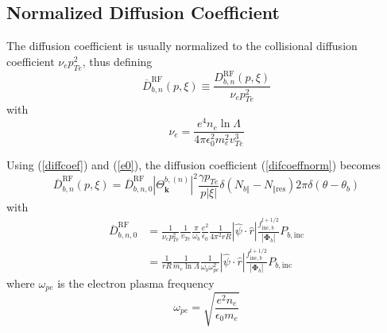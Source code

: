 \subsection{Normalized Diffusion Coefficient}

The diffusion coefficient is usually normalized to the collisional diffusion
coefficient $\nu_{e}p_{Te}^{2}$, thus defining
\begin{equation}
\overline{D}_{b,n}^{\text{RF}}(p,\xi)\equiv\frac{D_{b,n}^{\text{RF}}(p,\xi
)}{\nu_{e}p_{Te}^{2}} \label{difcoeffnorm}%
\end{equation}
with
\begin{equation}
\nu_{e}=\frac{e^{4}n_{e}\ln\Lambda}{4\pi\epsilon_{0}^{2}m_{e}^{2}v_{Te}^{3}}%
\end{equation}

Using (\ref{diffcoef}) and (\ref{e0}), the diffusion coefficient
(\ref{difcoeffnorm}) becomes
\begin{equation}
\overline{D}_{b,n}^{\text{RF}}(p,\xi)=\overline{D}_{b,n,0}^{\text{RF}}\left|
\Theta_{\mathbf{k}}^{b,\left(  n\right)  }\right|  ^{2}\frac{\gamma p_{Te}%
}{p\left|  \xi\right|  }\delta\left(  N_{b\Vert}-N_{\Vert\text{res}}\right)
2\pi\delta\left(  \theta-\theta_{b}\right)  \label{difcoeffnorm2}%
\end{equation}
with
\begin{align}
\overline{D}_{b,n,0}^{\text{RF}}  &  =\frac{1}{\nu_{e}p_{Te}^{2}}\frac
{1}{v_{Te}}\frac{\pi}{\omega_{b}}\frac{e^{2}}{\epsilon_{0}}\frac{1}{4\pi
^{2}rR}\left|  \widehat{\psi}\cdot\widehat{r}\right|  \frac{f_{\text{inc}%
,b}^{l+1/2}}{\left|  \mathbf{\Phi}_{b}\right|  }P_{b,\text{inc}}\nonumber\\
&  =\frac{1}{rR}\frac{1}{m_{e}\ln\Lambda}\frac{1}{\omega_{b}\omega_{pe}^{2}%
}\left|  \widehat{\psi}\cdot\widehat{r}\right|  \frac{f_{\text{inc},b}%
^{l+1/2}}{\left|  \mathbf{\Phi}_{b}\right|  }P_{b,\text{inc}} \label{drf0}%
\end{align}
where $\omega_{pe}$ is the electron plasma frequency
\begin{equation}
\omega_{pe}=\sqrt{\frac{e^{2}n_{e}}{\epsilon_{0}m_{e}}}%
\end{equation}

